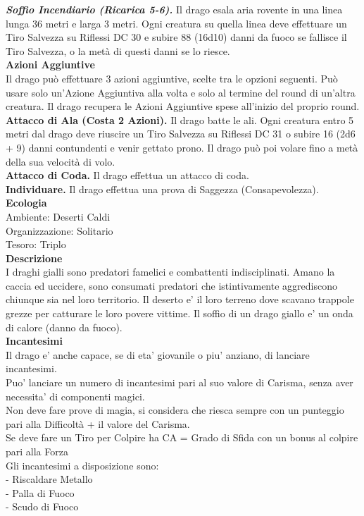 \begin{multicols}{2}
\emph{\textbf{Soffio Incendiario (Ricarica 5-6).}} Il drago esala aria rovente in una linea lunga 36 metri e larga 3 metri. Ogni creatura su quella linea deve effettuare un Tiro Salvezza su Riflessi DC 30 e subire 88 (16d10) danni da fuoco se fallisce il Tiro Salvezza, o la metà di questi danni se lo riesce.\\
\textbf{Azioni Aggiuntive}\\
Il drago può effettuare 3 azioni aggiuntive, scelte tra le opzioni seguenti. Può usare solo un'Azione Aggiuntiva alla volta e solo al termine del round di un'altra creatura. Il drago recupera le Azioni Aggiuntive spese all'inizio del proprio round.\\
\textbf{Attacco di Ala (Costa 2 Azioni).} Il drago batte le ali. Ogni creatura entro 5 metri dal drago deve riuscire un Tiro Salvezza su Riflessi DC  31 o subire 16 (2d6 + 9) danni contundenti e venir gettato prono. Il drago può poi volare fino a metà della sua velocità di volo.\\
\textbf{Attacco di Coda.} Il drago effettua un attacco di coda.\\
\textbf{Individuare.} Il drago effettua una prova di Saggezza (Consapevolezza).\\
\textbf{Ecologia}\\
Ambiente: Deserti Caldi\\
Organizzazione: Solitario\\
Tesoro: Triplo\\
\textbf{Descrizione}\\
I draghi gialli sono predatori famelici e combattenti indisciplinati. Amano la caccia ed uccidere, sono consumati predatori che istintivamente aggrediscono chiunque sia nel loro territorio. Il deserto e' il loro terreno dove scavano trappole grezze per catturare le loro povere vittime.
Il soffio di un drago giallo e' un onda di calore (danno da fuoco).
\\
\textbf{Incantesimi}\\
Il drago e' anche capace, se di eta' giovanile o piu' anziano, di lanciare incantesimi.\\
Puo' lanciare un numero di incantesimi pari al suo valore di Carisma, senza aver necessita' di componenti magici.\\
Non deve fare prove di magia, si considera che riesca sempre con un punteggio pari alla Difficoltà + il valore del Carisma.\\
Se deve fare un Tiro per Colpire ha CA = Grado di Sfida con un bonus al colpire pari alla Forza\\
Gli incantesimi a disposizione sono:\\
- Riscaldare Metallo\\
- Palla di Fuoco\\
- Scudo di Fuoco\\



\end{multicols}
